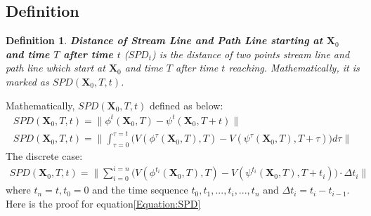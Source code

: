 \documentclass[
     11pt,         %
     a4paper,      %
     oneside,
     ]{article}
\newtheorem{mydef}{Definition}
\newcommand{\vect}[1]{\boldsymbol{#1}}
\begin{document}
    \subsection{Definition}
    \begin{mydef}
	\textbf{\textit{Distance of Stream Line and Path Line starting at $\vect{X}_{0}$ and time $T$ after time $t$}} (\textbf{\textit{$SPD_{t}$}}) is the distance of two points stream line and path line which start at $\vect{X}_{0}$ and time $T$ after time $t$ reaching. Mathematically, it is marked as $SPD(\vect{X}_{0},T,t)$.\\
    \end{mydef}
    Mathematically, $SPD(\vect{X}_{0},T,t)$ defined as below:
	\begin{eqnarray}
	\label{Equation:SPDDef}
	SPD(\vect{X}_{0},T,t)=\biggr\lVert\phi^{t}(\vect{X}_{0},T)-\psi^{t}(\vect{X}_{0},T+t)\biggr\rVert\\
	SPD(\vect{X}_{0},T,t)=\biggr\lVert\int_{\tau=0}^{\tau=t}\biggr( V(\phi^{\tau}(\vect{X}_{0},T),T)-V(\psi^{\tau}(\vect{X}_{0},T),T+\tau)\biggr) d\tau\biggr\rVert
	\end{eqnarray}
	The discrete case:
	\begin{eqnarray}
		\label{Equation:SPD}
		SPD(\vect{X}_{0},T,t)=\biggr\lVert\sum_{i=0}^{i=n}\biggr( V(\phi^{t_{i}}(\vect{X}_{0},T),T)-V(\psi^{t_{i}}(\vect{X}_{0},T),T+t_{i})\biggr)\cdot\Delta t_{i}\biggr\rVert
	\end{eqnarray}
	where $t_{n}=t, t_{0}=0$ and the time sequence  $t_{0},t_{1},...,t_{i},...,t_{n} $ and $\Delta t_{i}=t_{i}-t_{i-1}$.\\
	Here is the proof for equation\ref{Equation:SPD}
\end{document}
